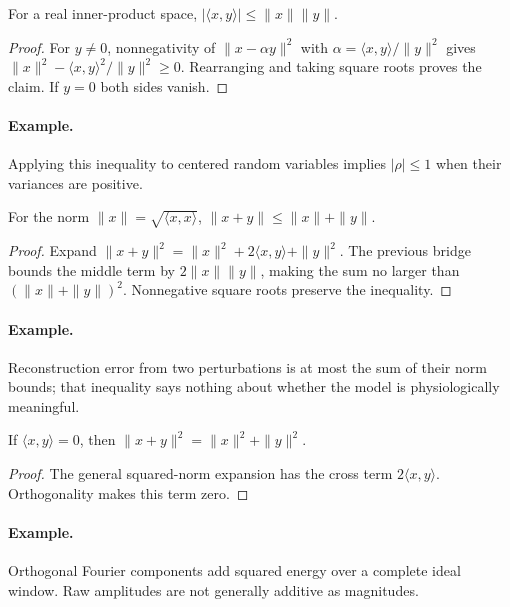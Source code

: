 \begin{theorem}For a real inner-product space, $|\langle x,y\rangle|\leq\|x\|\|y\|$.\end{theorem}
\begin{proof}For $y\neq0$, nonnegativity of $\|x-\alpha y\|^2$ with $\alpha=\langle x,y\rangle/\|y\|^2$ gives $\|x\|^2-\langle x,y\rangle^2/\|y\|^2\geq0$. Rearranging and taking square roots proves the claim. If $y=0$ both sides vanish.\end{proof}
\paragraph{Example.} Applying this inequality to centered random variables implies $|\rho|\leq1$ when their variances are positive.

\begin{proposition}For the norm $\|x\|=\sqrt{\langle x,x\rangle}$, $\|x+y\|\leq\|x\|+\|y\|$.\end{proposition}
\begin{proof}Expand $\|x+y\|^2=\|x\|^2+2\langle x,y\rangle+\|y\|^2$. The previous bridge bounds the middle term by $2\|x\|\|y\|$, making the sum no larger than $(\|x\|+\|y\|)^2$. Nonnegative square roots preserve the inequality.\end{proof}
\paragraph{Example.} Reconstruction error from two perturbations is at most the sum of their norm bounds; that inequality says nothing about whether the model is physiologically meaningful.

\begin{proposition}If $\langle x,y\rangle=0$, then $\|x+y\|^2=\|x\|^2+\|y\|^2$.\end{proposition}
\begin{proof}The general squared-norm expansion has the cross term $2\langle x,y\rangle$. Orthogonality makes this term zero.\end{proof}
\paragraph{Example.} Orthogonal Fourier components add squared energy over a complete ideal window. Raw amplitudes are not generally additive as magnitudes.

